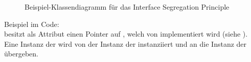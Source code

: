 \begin{figure}[ht!]
\vspace{0.25cm}
\begin{center}
\caption{Beispiel-Klassendiagramm für das Interface Segregation Principle}
\label{fig:ISP}
\end{center}

\vspace{0.25cm}
\end{figure}


Beispiel im Code:\\
 besitzt als Attribut einen Pointer auf , welch von  implementiert wird (siehe ). Eine Instanz der  wird von der Instanz der  instanziiert und an die Instanz der  übergeben.

